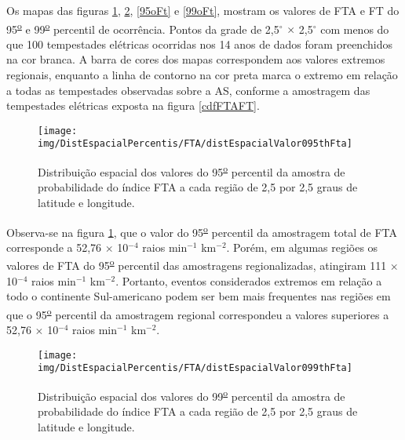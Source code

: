 
Os mapas das figuras \ref{95oFta}, \ref{99oFta}, \ref{95oFt}  e \ref{99oFt}, mostram os valores de FTA e FT do 95\textsuperscript{\underline{o}} e 99\textsuperscript{\underline{o}} percentil de ocorrência. Pontos da grade de 2,5$^{\circ}$ $\times$ 2,5$^{\circ}$ com menos do que 100 tempestades elétricas ocorridas nos 14 anos de dados foram preenchidos na cor branca. A barra de cores dos mapas correspondem aos valores extremos regionais, enquanto a linha de contorno na cor preta marca o extremo em relação a todas as tempestades observadas sobre a AS, conforme a amostragem das tempestades elétricas exposta na figura \ref{cdfFTAFT}.

\begin{figure}[!ht]
\centering
{\texttt{[image: img/DistEspacialPercentis/FTA/distEspacialValor095thFta]}} 
\caption{Distribuição espacial dos valores do 95\textsuperscript{\underline{o}} percentil da amostra de probabilidade do índice FTA a cada região de 2,5 por 2,5 graus de latitude e longitude.}
\label{95oFta}
\end{figure}

Observa-se na figura \ref{95oFta}, que o valor do 95\textsuperscript{\underline{o}} percentil da amostragem total de FTA corresponde a 52,76 $\times$ 10$^{-4}$ raios min$^{-1}$
km$^{-2}$. Porém, em algumas regiões os valores de FTA do 95\textsuperscript{\underline{o}} percentil das amostragens regionalizadas, atingiram  111 $\times$ 10$^{-4}$ raios min$^{-1}$ km$^{-2}$. Portanto, eventos considerados extremos em relação a todo o continente Sul-americano podem ser bem mais frequentes nas regiões em que o 95\textsuperscript{\underline{o}} percentil da amostragem regional correspondeu a valores superiores a 52,76 $\times$ 10$^{-4}$ raios min$^{-1}$ km$^{-2}$.
  
\begin{figure}[!ht]
\centering  
{\texttt{[image: img/DistEspacialPercentis/FTA/distEspacialValor099thFta]}}
\caption{Distribuição espacial dos valores do  99\textsuperscript{\underline{o}} percentil da amostra de probabilidade do índice FTA a cada região de 2,5 por 2,5 graus de latitude e longitude.}
\label{99oFta}
\end{figure} 

